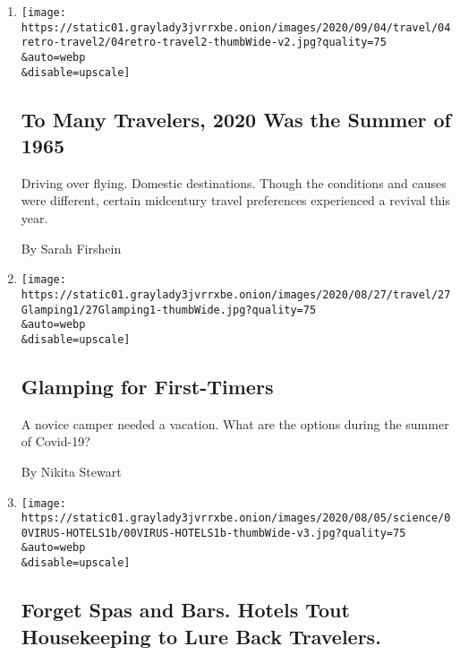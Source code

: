 \begin{enumerate}
\def\labelenumi{\arabic{enumi}.}
\item
  \href{/2020/09/04/travel/to-many-travelers-2020-was-the-summer-of-1965.html}{}

  \texttt{[image: https://static01.graylady3jvrrxbe.onion/images/2020/09/04/travel/04retro-travel2/04retro-travel2-thumbWide-v2.jpg?quality=75\\\&auto=webp\\\&disable=upscale]}

  \hypertarget{to-many-travelers-2020-was-the-summer-of-1965}{%
  \subsection{To Many Travelers, 2020 Was the Summer of
  1965}\label{to-many-travelers-2020-was-the-summer-of-1965}}

  Driving over flying. Domestic destinations. Though the conditions and
  causes were different, certain midcentury travel preferences
  experienced a revival this year.

  By Sarah Firshein
\item
  \href{/2020/09/03/travel/virus-glamping.html}{}

  \texttt{[image: https://static01.graylady3jvrrxbe.onion/images/2020/08/27/travel/27Glamping1/27Glamping1-thumbWide.jpg?quality=75\\\&auto=webp\\\&disable=upscale]}

  \hypertarget{glamping-for-first-timers}{%
  \subsection{Glamping for
  First-Timers}\label{glamping-for-first-timers}}

  A novice camper needed a vacation. What are the options during the
  summer of Covid-19?

  By Nikita Stewart
\item
  \href{/2020/08/04/health/coronavirus-hotels-infect.html}{}

  \texttt{[image: https://static01.graylady3jvrrxbe.onion/images/2020/08/05/science/00VIRUS-HOTELS1b/00VIRUS-HOTELS1b-thumbWide-v3.jpg?quality=75\\\&auto=webp\\\&disable=upscale]}

  \hypertarget{forget-spas-and-bars-hotels-tout-housekeeping-to-lure-back-travelers}{%
  \subsection{Forget Spas and Bars. Hotels Tout Housekeeping to Lure
  Back
  Travelers.}\label{forget-spas-and-bars-hotels-tout-housekeeping-to-lure-back-travelers}}


\end{enumerate}
